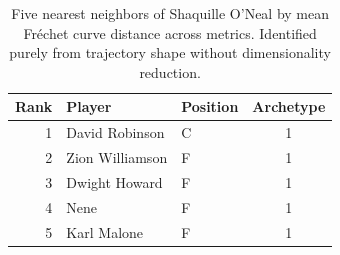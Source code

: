 \begin{table}[htbp]
  \centering\small
  \begin{tabular}{rllc}
    \toprule
    Rank & Player & Position & Archetype \\
    \midrule
    1 & David Robinson & C & 1 \\
    2 & Zion Williamson & F & 1 \\
    3 & Dwight Howard & F & 1 \\
    4 & Nene & F & 1 \\
    5 & Karl Malone & F & 1 \\
    \bottomrule
  \end{tabular}
  \caption{Five nearest neighbors of Shaquille O'Neal by mean Fr\'{e}chet curve distance across metrics. Identified purely from trajectory shape without dimensionality reduction.}
  \label{tab:Shaquille_O_Neal_frechet_curve_neighbors}
\end{table}

